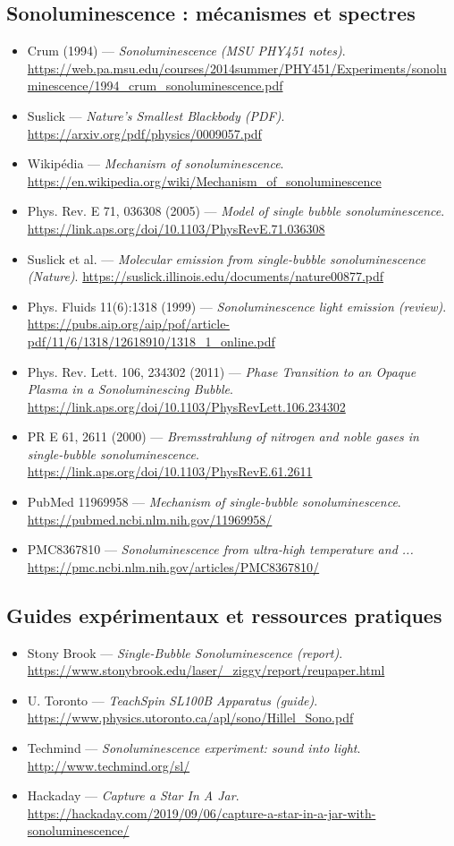 \documentclass[a4paper,12pt]{article}
\begin{document}
\subsection*{Sonoluminescence : mécanismes et spectres}
\begin{itemize}
\item Crum (1994) — \textit{Sonoluminescence (MSU PHY451 notes)}. \url{https://web.pa.msu.edu/courses/2014summer/PHY451/Experiments/sonoluminescence/1994_crum_sonoluminescence.pdf}
\item Suslick — \textit{Nature’s Smallest Blackbody (PDF)}. \url{https://arxiv.org/pdf/physics/0009057.pdf}
\item Wikipédia — \textit{Mechanism of sonoluminescence}. \url{https://en.wikipedia.org/wiki/Mechanism_of_sonoluminescence}
\item Phys. Rev. E 71, 036308 (2005) — \textit{Model of single bubble sonoluminescence}. \url{https://link.aps.org/doi/10.1103/PhysRevE.71.036308}
\item Suslick et al. — \textit{Molecular emission from single-bubble sonoluminescence (Nature)}. \url{https://suslick.illinois.edu/documents/nature00877.pdf}
\item Phys. Fluids 11(6):1318 (1999) — \textit{Sonoluminescence light emission (review)}. \url{https://pubs.aip.org/aip/pof/article-pdf/11/6/1318/12618910/1318_1_online.pdf}
\item Phys. Rev. Lett. 106, 234302 (2011) — \textit{Phase Transition to an Opaque Plasma in a Sonoluminescing Bubble}. \url{https://link.aps.org/doi/10.1103/PhysRevLett.106.234302}
\item PR E 61, 2611 (2000) — \textit{Bremsstrahlung of nitrogen and noble gases in single-bubble sonoluminescence}. \url{https://link.aps.org/doi/10.1103/PhysRevE.61.2611}
\item PubMed 11969958 — \textit{Mechanism of single-bubble sonoluminescence}. \url{https://pubmed.ncbi.nlm.nih.gov/11969958/}
\item PMC8367810 — \textit{Sonoluminescence from ultra-high temperature and ...} \url{https://pmc.ncbi.nlm.nih.gov/articles/PMC8367810/}
\end{itemize}

\subsection*{Guides expérimentaux et ressources pratiques}
\begin{itemize}
\item Stony Brook — \textit{Single-Bubble Sonoluminescence (report)}. \url{https://www.stonybrook.edu/laser/_ziggy/report/reupaper.html}
\item U. Toronto — \textit{TeachSpin SL100B Apparatus (guide)}. \url{https://www.physics.utoronto.ca/apl/sono/Hillel_Sono.pdf}
\item Techmind — \textit{Sonoluminescence experiment: sound into light}. \url{http://www.techmind.org/sl/}
\item Hackaday — \textit{Capture a Star In A Jar}. \url{https://hackaday.com/2019/09/06/capture-a-star-in-a-jar-with-sonoluminescence/}
\end{itemize}
\end{document}
